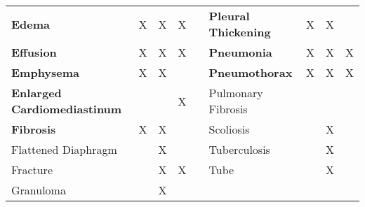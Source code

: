 \documentclass[authoryear,preprint,review,12pt]{elsarticle}
\begin{document}
\begin{table}[htbp]
{\begin{tabular}{lcccrlccc}
\cellcolor[HTML]{E9ECE6}\textbf{Edema} & \cellcolor[HTML]{E9ECE6}X & \cellcolor[HTML]{E9ECE6}X & \cellcolor[HTML]{E9ECE6}X &  & \textbf{Pleural Thickening} & X & X &  \\
\textbf{Effusion} & X & X & X &  & \cellcolor[HTML]{E9ECE6}\textbf{Pneumonia} & \cellcolor[HTML]{E9ECE6}X & \cellcolor[HTML]{E9ECE6}X & \cellcolor[HTML]{E9ECE6}X \\
\textbf{Emphysema} & X & X &  &  & \textbf{Pneumothorax} & X & X & X \\
\cellcolor[HTML]{E9ECE6}\textbf{Enlarged   Cardiomediastinum} & \cellcolor[HTML]{E9ECE6} & \cellcolor[HTML]{E9ECE6} & \cellcolor[HTML]{E9ECE6}X & \multicolumn{1}{l}{} & {Pulmonary Fibrosis} &  &  &  \\
\textbf{Fibrosis} & X & X &  &  & {Scoliosis} &  & X &  \\
{Flattened   Diaphragm} &  & X &  &  & {Tuberculosis} &  & X &  \\
{Fracture} &  & X & X &  & {Tube} &  & X &  \\
{Granuloma} &  & X &  &  &  & \multicolumn{1}{l}{} & \multicolumn{1}{l}{} & \multicolumn{1}{l}{}
\end{tabular}}
\end{table}
\end{document}
